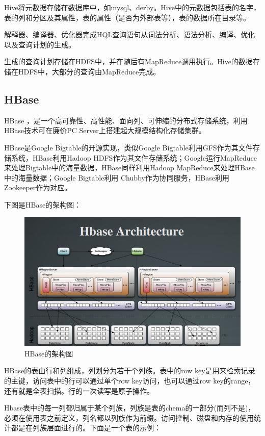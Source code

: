   Hive将元数据存储在数据库中，如mysql、derby。Hive中的元数据包括表的名字，表的列和分区及其属性，表的属性（是否为外部表等），表的数据所在目录等。


  解释器、编译器、优化器完成HQL查询语句从词法分析、语法分析、编译、优化以及查询计划的生成。


生成的查询计划存储在HDFS中，并在随后有MapReduce调用执行。Hive的数据存储在HDFS中，大部分的查询由MapReduce完成。

\subsection{HBase}
  HBase ，是一个高可靠性、高性能、面向列、可伸缩的分布式存储系统，利用HBase技术可在廉价PC Server上搭建起大规模结构化存储集群。


  HBase是Google Bigtable的开源实现，类似Google Bigtable利用GFS作为其文件存储系统，HBase利用Hadoop HDFS作为其文件存储系统；Google运行MapReduce来处理Bigtable中的海量数据，HBase同样利用Hadoop MapReduce来处理HBase中的海量数据；Google Bigtable利用 Chubby作为协同服务，HBase利用Zookeeper作为对应。


  下图是HBase的架构图： 


\begin{figure}[!ht]
\centering
\includegraphics[scale=0.5]{photo/hbase.JPG}
\caption{HBase的架构图}
\end{figure}


  HBase的表由行和列组成，列划分为若干个列族。表中的row key是用来检索记录的主键，访问表中的行可以通过单个row key访问，也可以通过row key的range，还有就是全表扫描。行的一次读写是原子操作。


  Hbase表中的每一列都归属于某个列族，列族是表的chema的一部分(而列不是)，必须在使用表之前定义，列名都以列族作为前缀。访问控制、磁盘和内存的使用统计都是在列族层面进行的。下面是一个表的示例：
\clearpage

